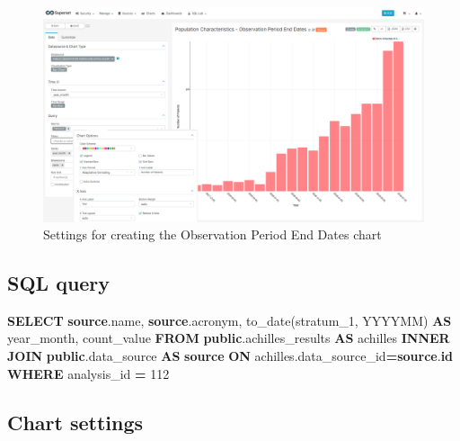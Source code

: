 \documentclass[
]{book}
\newenvironment{Shaded}{\begin{snugshade}}{\end{snugshade}}
\newcommand{\DecValTok}[1]{\textcolor[rgb]{0.00,0.00,0.81}{#1}}
\newcommand{\FunctionTok}[1]{\textcolor[rgb]{0.00,0.00,0.00}{#1}}
\newcommand{\KeywordTok}[1]{\textcolor[rgb]{0.13,0.29,0.53}{\textbf{#1}}}
\newcommand{\NormalTok}[1]{#1}
\newcommand{\OperatorTok}[1]{\textcolor[rgb]{0.81,0.36,0.00}{\textbf{#1}}}
\newcommand{\StringTok}[1]{\textcolor[rgb]{0.31,0.60,0.02}{#1}}
\begin{document}
\begin{figure}
\includegraphics[width=1\linewidth]{images/05-observation_period/04-observation_period_end_dates} \caption{Settings for creating the Observation Period End Dates chart}\label{fig:observationPeriodEndDates}
\end{figure}

\hypertarget{sql-query-15}{%
\subsection{SQL query}\label{sql-query-15}}

\begin{Shaded}
\begin{Highlighting}[]
\KeywordTok{SELECT} \KeywordTok{source}\NormalTok{.name,}
       \KeywordTok{source}\NormalTok{.acronym,}
       \FunctionTok{to\_date}\NormalTok{(stratum\_1, }\StringTok{\textquotesingle{}YYYYMM\textquotesingle{}}\NormalTok{) }\KeywordTok{AS}\NormalTok{ year\_month,}
\NormalTok{       count\_value}
\KeywordTok{FROM} \KeywordTok{public}\NormalTok{.achilles\_results }\KeywordTok{AS}\NormalTok{ achilles}
\KeywordTok{INNER} \KeywordTok{JOIN} \KeywordTok{public}\NormalTok{.data\_source }\KeywordTok{AS} \KeywordTok{source} \KeywordTok{ON}\NormalTok{ achilles.data\_source\_id}\OperatorTok{=}\KeywordTok{source}\NormalTok{.}\KeywordTok{id}
\KeywordTok{WHERE}\NormalTok{ analysis\_id }\OperatorTok{=} \DecValTok{112}
\end{Highlighting}
\end{Shaded}

\hypertarget{chart-settings-15}{%
\subsection{Chart settings}\label{chart-settings-15}}
\end{document}
